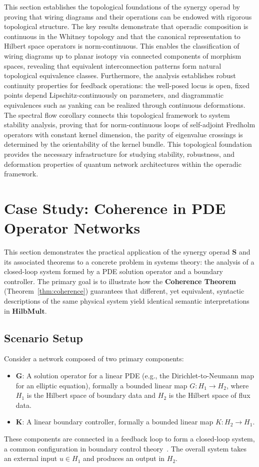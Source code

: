 \documentclass[11pt]{article}
\begin{document}
This section establishes the topological foundations of the synergy operad by proving that wiring diagrams and their operations can be endowed with rigorous topological structure. The key results demonstrate that operadic composition is continuous in the Whitney topology and that the canonical representation to Hilbert space operators is norm-continuous. This enables the classification of wiring diagrams up to planar isotopy via connected components of morphism spaces, revealing that equivalent interconnection patterns form natural topological equivalence classes. Furthermore, the analysis establishes robust continuity properties for feedback operations: the well-posed locus is open, fixed points depend Lipschitz-continuously on parameters, and diagrammatic equivalences such as yanking can be realized through continuous deformations. The spectral flow corollary connects this topological framework to system stability analysis, proving that for norm-continuous loops of self-adjoint Fredholm operators with constant kernel dimension, the parity of eigenvalue crossings is determined by the orientability of the kernel bundle. This topological foundation provides the necessary infrastructure for studying stability, robustness, and deformation properties of quantum network architectures within the operadic framework.


\section{Case Study: Coherence in PDE Operator Networks}\label{sec:Case Study: Coherence in PDE Operator Networks}


This section demonstrates the practical application of the synergy operad $\mathbf{S}$ and its associated theorems to a concrete problem in systems theory: the analysis of a closed-loop system formed by a PDE solution operator and a boundary controller. The primary goal is to illustrate how the \textbf{Coherence Theorem} (Theorem~\ref{thm:coherence}) guarantees that different, yet equivalent, syntactic descriptions of the same physical system yield identical semantic interpretations in $\mathbf{HilbMult}$.

\subsection{Scenario Setup}

Consider a network composed of two primary components:
\begin{itemize}
    \item $\mathbf{G}$: A solution operator for a linear PDE (e.g., the Dirichlet-to-Neumann map for an elliptic equation), formally a bounded linear map $G: H_1 \to H_2$, where $H_1$ is the Hilbert space of boundary data and $H_2$ is the Hilbert space of flux data.
    \item $\mathbf{K}$: A linear boundary controller, formally a bounded linear map $K: H_2 \to H_1$.
\end{itemize}
These components are connected in a feedback loop to form a closed-loop system, a common configuration in boundary control theory~\cite{belishev2007recent}. The overall system takes an external input $u \in H_1$ and produces an output in $H_2$.
\end{document}
